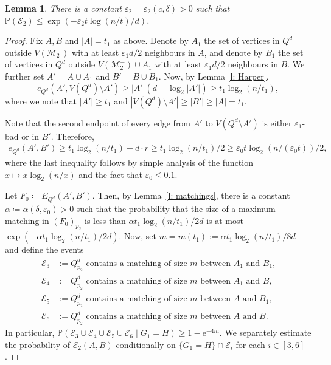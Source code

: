 \documentclass[reqno,final,a4paper]{amsart}
\newtheorem{lemma}[thm]{Lemma}
\theoremstyle{definition}
\newcommand{\cE}{\mathcal{E}}
\newcommand{\cM}{\mathcal{M}}
\def\e{\mathrm{e}}
\def\eps{\varepsilon}
\newcommand{\1}{\mathbbm{1}}
\begin{document}
\begin{lemma}\label{lem:estimate_E2}
There is a constant $\eps_2 = \eps_2(c,\delta)>0$ such that $\mathbb P(\cE_2)\le \exp(-\eps_2 t\log(n/t)/d)$.
\end{lemma}
\begin{proof}
Fix $A,B$ and $|A|=t_1$ as above. Denote by $A_1$ the set of vertices in $Q^d$ outside $V(\cM_2^-)$ with at least $\eps_1d/2$ neighbours in $A$, and denote by $B_1$ the set of vertices in $Q^d$ outside $V(\cM_2^-)\cup A_1$ with at least $\eps_1d/2$ neighbours in $B$. 
We further set $A'=A\cup A_1$ and $B'=B\cup B_1$. Now, by Lemma \ref{l: Harper},
$$
e_{Q^d}(A',V(Q^d)\setminus A')\ge|A'|(d-\log_2|A'|)\ge t_1\log_2(n/t_1),
$$
where we note that $|A'|\ge t_1$ and $|V(Q^d)\setminus A'|\ge |B'|\ge |A|=t_1$.

Note that the second endpoint of every edge from $A'$ to $V(Q^d\setminus A')$ is either $\eps_1$-bad or in $B'$.
Therefore,
\begin{align}\label{eq:bipartite}
e_{Q^d}(A',B')\ge t_1\log_2(n/t_1)-d\cdot r \ge t_1\log_2(n/t_1)/2 \ge \varepsilon_0 t\log_2(n/(\varepsilon_0 t))/2,
\end{align}
where the last inequality follows by simple analysis of the function $x\mapsto x\log_2(n/x)$ and the fact that $\eps_0\le 0.1$.

Let $F_0\coloneqq E_{Q^d}(A',B')$. Then, by Lemma~\ref{l: matchings}, there is a constant $\alpha\coloneqq \alpha(\delta,\eps_0)>0$ such that the probability that the size of a maximum matching in $(F_0)_{p_2}$ is less than $\alpha t_1\log_2(n/t_1)/2d$ is at most $\exp(-\alpha t_1\log_2(n/t_1)/2d)$.
Now, set $m=m(t_1):=\alpha t_1\log_2(n/t_1)/8d$ and define the events 
\begin{align*}
\cE_3 &:= \text{$Q^d_{p_2}$ contains a matching of size $m$ between $A_1$ and $B_1$,}\\
\cE_4 &:= \text{$Q^d_{p_2}$ contains a matching of size $m$ between $A_1$ and $B$,}\\
\cE_5 &:= \text{$Q^d_{p_2}$ contains a matching of size $m$ between $A$ and $B_1$,}\\
\cE_6 &:= \text{$Q^d_{p_2}$ contains a matching of size $m$ between $A$ and $B$.}
\end{align*}
In particular, $\mathbb P(\cE_3\cup\cE_4\cup\cE_5\cup\cE_6\mid G_1=H)\ge 1-\e^{-4m}$.
We separately estimate the probability of $\cE_2(A,B)$ conditionally on $\{G_1=H\}\cap \cE_i$ for each $i\in [3,6]$.


\end{proof}
\end{document}
